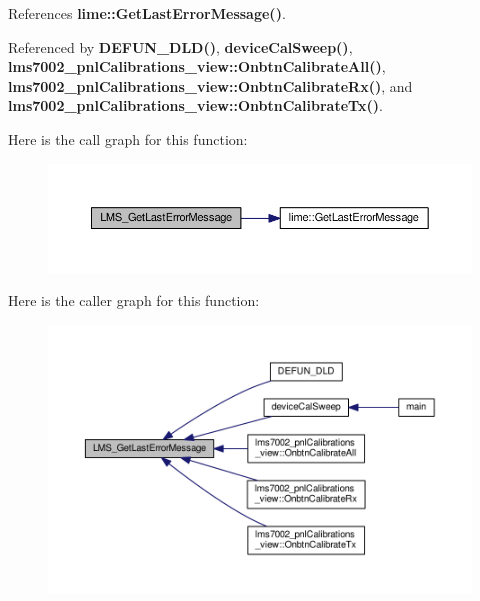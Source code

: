References {\bf lime\+::\+Get\+Last\+Error\+Message()}.



Referenced by {\bf D\+E\+F\+U\+N\+\_\+\+D\+L\+D()}, {\bf device\+Cal\+Sweep()}, {\bf lms7002\+\_\+pnl\+Calibrations\+\_\+view\+::\+Onbtn\+Calibrate\+All()}, {\bf lms7002\+\_\+pnl\+Calibrations\+\_\+view\+::\+Onbtn\+Calibrate\+Rx()}, and {\bf lms7002\+\_\+pnl\+Calibrations\+\_\+view\+::\+Onbtn\+Calibrate\+Tx()}.



Here is the call graph for this function\+:
\nopagebreak
\begin{figure}[H]
\begin{center}
\leavevmode
\includegraphics[width=350pt]{df/de1/lms7__api_8cpp_a50e22f8ed4b6a628841c5f8b4a0be215_cgraph}
\end{center}
\end{figure}




Here is the caller graph for this function\+:
\nopagebreak
\begin{figure}[H]
\begin{center}
\leavevmode
\includegraphics[width=350pt]{df/de1/lms7__api_8cpp_a50e22f8ed4b6a628841c5f8b4a0be215_icgraph}
\end{center}
\end{figure}


